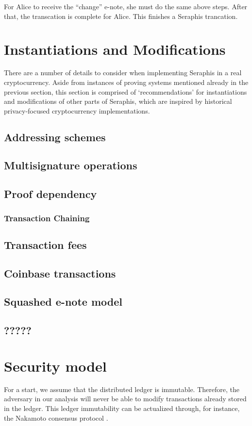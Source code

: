 \documentclass{article}
\begin{document}
For Alice to receive the ``change'' e-note, she must do the same above steps. After that, the transcation is complete for Alice. This finishes a Seraphis trancation.

\section{Instantiations and Modifications}\label{inst}
There are a number of details to consider when implementing Seraphis in a real cryptocurrency. Aside from instances of proving systems mentioned already in the previous section, this section is comprised of `recommendations' for instantiations and modifications of other parts of Seraphis, which are inspired by historical privacy-focused cryptocurrency implementations.

\subsection{Addressing schemes}\label{addr-scheme}
\subsection{Multisignature operations}
\subsection{Proof dependency}\label{proof-dep}
\subsubsection*{Transaction Chaining}
\subsection{Transaction fees}
\subsection{Coinbase transactions}
\subsection{Squashed e-note model}
\subsection{?????}

\section{Security model}\label{sec}
For a start, we assume that the distributed ledger is immutable. Therefore, the adversary in our analysis will never be able to modify transactions already stored in the ledger. This ledger immutability can be actualized through, for instance, the Nakamoto consensus protocol \cite{bitcoin}.
\end{document}
